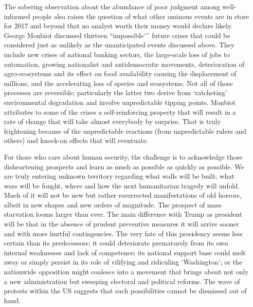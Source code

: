 \documentclass[10pt,a4paper]{article}
\begin{document}
\begin{multicols}{2}

The sobering observation about the abundance of poor judgment among well-informed people also raises the question of what other ominous events are in store for 2017 and beyond that no analyst worth their money would declare likely. George Monbiot \citep{r02} discussed thirteen ``impossible`'' future crises that could be considered just as unlikely as the unanticipated events discussed above. They include new crises of national banking sectors, the large-scale loss of jobs to automation, growing nationalist and antidemocratic movements, deterioration of agro-ecosystems and its effect on food availability causing the displacement of millions, and the accelerating loss of species and ecosystems. Not all of those processes are reversible; particularly the latter two derive from `ratcheting' environmental degradation and involve unpredictable tipping points. Monbiot attributes to some of the crises a self-reinforcing property that will result in a rate of change that will take almost everybody by surprise. That is truly frightening because of the unpredictable reactions (from unpredictable rulers and others) and knock-on effects that will eventuate.

For those who care about human security, the challenge is to acknowledge those disheartening prospects and learn as much as possible as quickly as possible. We are truly entering unknown territory regarding what walls will be built, what wars will be fought, where and how the next humanitarian tragedy will unfold. Much of it will not be new but rather resurrected manifestations of old horrors, albeit in new shapes and new orders of magnitude. The prospect of mass starvation looms larger than ever. The main difference with Trump as president will be that in the absence of prudent preventive measures it will arrive sooner and with more hurtful contingencies. The very fate of this presidency seems less certain than its predecessors; it could deteriorate prematurely from its own internal weaknesses and lack of competence; its national support base could melt away or simply persist in its role of vilifying and ridiculing `Washington'; or the nationwide opposition might coalesce into a movement that brings about not only a new administration but sweeping electoral and political reforms. The wave of protests within the US suggests that such possibilities cannot be dismissed out of hand.


\end{multicols}
\end{document}
